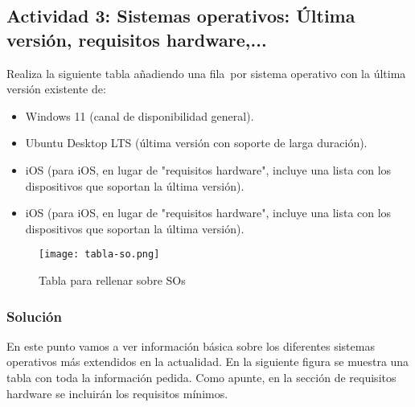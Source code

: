 \subsection{Actividad 3:  Sistemas operativos: Última versión, requisitos hardware,...}
Realiza la siguiente tabla añadiendo una fila por sistema operativo con la última versión existente de:

\begin{itemize}
    \item Windows 11 (canal de disponibilidad general).
    \item Ubuntu Desktop LTS (última versión con soporte de larga duración).
    \item iOS (para iOS, en lugar de "requisitos hardware", incluye una lista con los dispositivos que soportan la última versión).
    \item iOS (para iOS, en lugar de "requisitos hardware", incluye una lista con los dispositivos que soportan la última versión).
\end{itemize}

\begin{figure}[ht]
    \centering
    \texttt{[image: tabla-so.png]}
    \caption{Tabla para rellenar sobre SOs}
\end{figure}

\subsubsection{Solución}
En este punto vamos a ver información básica sobre los diferentes sistemas operativos más extendidos en la actualidad. En la siguiente figura se muestra una tabla con toda la información pedida. Como apunte, en la sección de requisitos hardware se incluirán los requisitos mínimos.



\newpage



